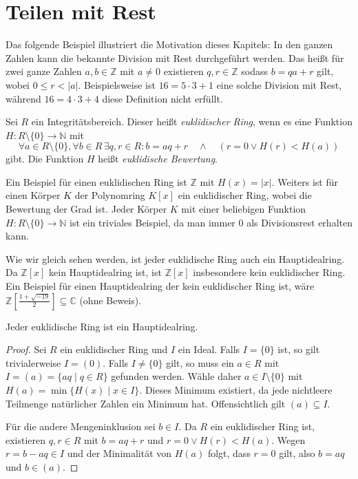 \section{Teilen mit Rest}


\begin{example}
    Das folgende Beispiel illustriert die Motivation dieses Kapitels: In den ganzen Zahlen kann die bekannte Division mit Rest durchgeführt werden. Das heißt für zwei ganze Zahlen $a,b\in \mathbb{Z}$ mit $a\neq 0$ existieren $q,r\in\mathbb{Z}$ sodass $b=qa+r$ gilt, wobei $0\le r<|a|$. Beispielsweise ist $16=5\cdot 3+1$ eine solche Division mit Rest, während $16=4\cdot 3+4$
    diese Definition nicht erfüllt.
\end{example}

\begin{definition}
    Sei $R$ ein Integritätsbereich. Dieser heißt \emph{euklidischer Ring}, wenn es eine Funktion $H:R\setminus\{0\}\to\mathbb{N}$ mit
    $$\forall a\in R\setminus\{0\},\forall b\in R\,\exists q,r\in R:b=aq+r \quad \land \quad (r=0\lor H(r)<H(a))$$ gibt. Die Funktion $H$ heißt \emph{euklidische Bewertung}.
\end{definition}

\begin{example}
    Ein Beispiel für einen euklidischen Ring ist $\mathbb{Z}$ mit $H(x)=|x|$.
    Weiters ist für einen Körper $K$ der Polynomring $K[x]$ ein euklidischer Ring, wobei die Bewertung der Grad ist. Jeder Körper $K$ mit einer beliebigen Funktion $H:R\setminus\{0\}\to\mathbb{N}$ ist ein triviales Beispiel, da man immer $0$ als Divisionsrest erhalten kann.
\end{example}

\begin{example}
    Wie wir gleich sehen werden, ist jeder euklidische Ring auch ein Hauptidealring. Da
    $\mathbb{Z}[x]$ kein Hauptidealring ist, ist $\mathbb{Z}[x]$ insbesondere kein euklidischer Ring. Ein Beispiel für einen Hauptidealring der kein euklidischer Ring ist, wäre $\mathbb{Z}[\frac{1+\sqrt{-19}}{2}]\subseteq \mathbb{C}$ (ohne Beweis).
\end{example}

\begin{theorem}
    Jeder euklidische Ring ist ein Hauptidealring.
\end{theorem}
\begin{proof}
    Sei $R$ ein euklidischer Ring und $I$ ein Ideal. Falls $I=\{0\}$ ist, so gilt trivialerweise $I=(0)$. Falls $I\neq \{0\}$ gilt, so muss ein $a\in R$ mit $I=(a)=\{aq\mid q\in R\}$ gefunden werden. Wähle daher $a\in I\setminus\{0\}$ mit $H(a)=\min\{H(x)\mid x\in I\}$. Dieses Minimum existiert, da jede nichtleere Teilmenge natürlicher Zahlen ein Minimum hat. Offensichtlich gilt $(a)\subseteq I$.

    Für die andere Mengeninklusion sei $b\in I$. Da $R$ ein euklidischer Ring ist, existieren $q,r\in R$ mit $b=aq+r$ und $r=0\lor H(r)<H(a)$. Wegen $r=b-aq\in I$ und der Minimalität von $H(a)$
    folgt, dass $r=0$ gilt, also $b=aq$ und $b\in (a)$.
\end{proof}

